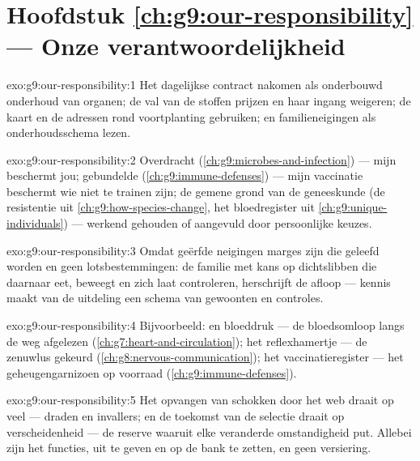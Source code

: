 \section*{Hoofdstuk \ref{ch:g9:our-responsibility} --- Onze verantwoordelijkheid}

\begin{solution}{exo:g9:our-responsibility:1}
Het dagelijkse contract nakomen als onderbouwd onderhoud van
organen; de val van de stoffen prijzen en haar ingang weigeren; de
kaart en de adressen rond voortplanting gebruiken; en
familieneigingen als onderhoudsschema lezen.
\end{solution}

\begin{solution}{exo:g9:our-responsibility:2}
Overdracht (\cref{ch:g9:microbes-and-infection}) --- mijn 
beschermt jou; gebundelde 
(\cref{ch:g9:immune-defenses}) --- mijn vaccinatie beschermt wie
niet te trainen zijn; de gemene grond van de geneeskunde (de
resistentie uit \cref{ch:g9:how-species-change}, het bloedregister
uit \cref{ch:g9:unique-individuals}) --- werkend gehouden of
aangevuld door persoonlijke keuzes.
\end{solution}

\begin{solution}{exo:g9:our-responsibility:3}
Omdat geërfde neigingen marges zijn die geleefd worden en geen
lotsbestemmingen: de familie met kans op dichtslibben die daarnaar
eet, beweegt en zich laat controleren, herschrijft de afloop ---
kennis maakt van de uitdeling een schema van gewoonten en
controles.
\end{solution}

\begin{solution}{exo:g9:our-responsibility:4}
Bijvoorbeeld:  en bloeddruk --- de bloedsomloop langs de weg
afgelezen (\cref{ch:g7:heart-and-circulation}); het reflexhamertje
--- de zenuwlus gekeurd
(\cref{ch:g8:nervous-communication}); het vaccinatieregister ---
het geheugengarnizoen op voorraad
(\cref{ch:g9:immune-defenses}).
\end{solution}

\begin{solution}{exo:g9:our-responsibility:5}
Het opvangen van schokken door het web draait op veel  ---
draden en invallers; en de toekomst van de selectie draait op
verscheidenheid --- de reserve waaruit elke veranderde
omstandigheid put. Allebei zijn het functies, uit te geven en op de
bank te zetten, en geen versiering.
\end{solution}

